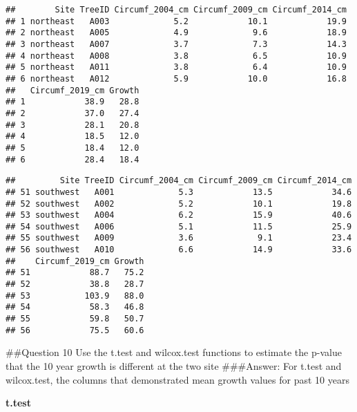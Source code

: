 \documentclass[]{article}
\newenvironment{Shaded}{\begin{snugshade}}{\end{snugshade}}
\newcommand{\DecValTok}[1]{\textcolor[rgb]{0.00,0.00,0.81}{#1}}
\newcommand{\KeywordTok}[1]{\textcolor[rgb]{0.13,0.29,0.53}{\textbf{#1}}}
\newcommand{\NormalTok}[1]{#1}
\newcommand{\OperatorTok}[1]{\textcolor[rgb]{0.81,0.36,0.00}{\textbf{#1}}}
\newcommand{\StringTok}[1]{\textcolor[rgb]{0.31,0.60,0.02}{#1}}
\begin{document}
\begin{verbatim}
##        Site TreeID Circumf_2004_cm Circumf_2009_cm Circumf_2014_cm
## 1 northeast   A003             5.2            10.1            19.9
## 2 northeast   A005             4.9             9.6            18.9
## 3 northeast   A007             3.7             7.3            14.3
## 4 northeast   A008             3.8             6.5            10.9
## 5 northeast   A011             3.8             6.4            10.9
## 6 northeast   A012             5.9            10.0            16.8
##   Circumf_2019_cm Growth
## 1            38.9   28.8
## 2            37.0   27.4
## 3            28.1   20.8
## 4            18.5   12.0
## 5            18.4   12.0
## 6            28.4   18.4
\end{verbatim}

\begin{Shaded}
\end{Shaded}

\begin{verbatim}
##         Site TreeID Circumf_2004_cm Circumf_2009_cm Circumf_2014_cm
## 51 southwest   A001             5.3            13.5            34.6
## 52 southwest   A002             5.2            10.1            19.8
## 53 southwest   A004             6.2            15.9            40.6
## 54 southwest   A006             5.1            11.5            25.9
## 55 southwest   A009             3.6             9.1            23.4
## 56 southwest   A010             6.6            14.9            33.6
##    Circumf_2019_cm Growth
## 51            88.7   75.2
## 52            38.8   28.7
## 53           103.9   88.0
## 54            58.3   46.8
## 55            59.8   50.7
## 56            75.5   60.6
\end{verbatim}

\#\#Question 10 Use the t.test and wilcox.test functions to estimate the
p-value that the 10 year growth is different at the two site
\#\#\#Answer: For t.test and wilcox.test, the columns that demonstrated
mean growth values for past 10 years

\textbf{t.test}

\begin{Shaded}
\end{Shaded}
\end{document}
